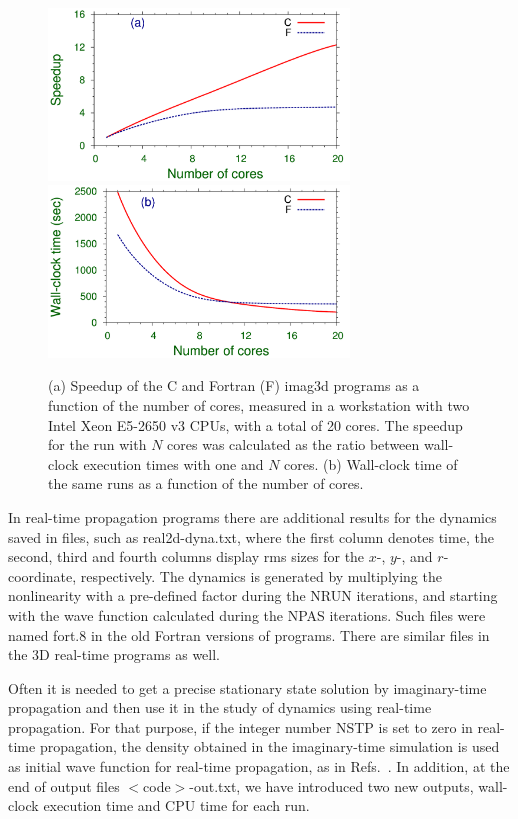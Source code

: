 \documentclass[onecolumn,3p]{elsarticle}
\begin{document}
\begin{small}
\begin{figure}[!t] 
\begin{center}
\includegraphics[width=8cm]{fig1a}
\includegraphics[width=8cm]{fig1b}
\caption{(a) Speedup of the C and Fortran (F) imag3d programs as a function of the number of cores, measured in a
workstation with two Intel Xeon E5-2650 v3 CPUs, with a total of 20 cores.
The speedup for the run with $N$ cores was calculated as the ratio between wall-clock execution times with one and $N$ cores. (b) Wall-clock time of the same runs as a function of the number of cores.}
\label{fig1}
\end{center}
\end{figure} 
\vspace*{8mm}

In real-time propagation programs there are additional results for the dynamics saved in files, such as
real2d-dyna.txt, where the first column denotes time, the second, third and fourth columns display rms 
sizes for the $x$-, $y$-, and $r$-coordinate, respectively. The dynamics is generated by multiplying the nonlinearity 
with a pre-defined factor during the NRUN iterations, and starting with the wave function calculated during the NPAS iterations. 
Such files were named fort.8 in the old Fortran versions of programs.
There are similar files in the 3D real-time programs as well.

Often it is needed to get a precise stationary state solution by imaginary-time propagation and then use it
in the study of dynamics using real-time propagation.
For that purpose, if the integer number NSTP is set to zero in real-time propagation, the density obtained in 
the imaginary-time simulation is used as initial wave function for real-time propagation, as in Refs.~\cite{dbec2015,dbec2016}.
In addition, at the end of output files $<$code$>$-out.txt, we have introduced two new outputs, 
wall-clock execution time and CPU time for each run.


\end{small}
\end{document}

